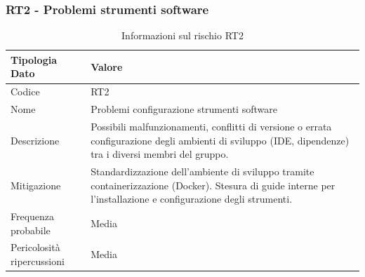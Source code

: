 \documentclass[a4paper,12pt]{article}
\begin{document}
\subsubsection{RT2 - Problemi strumenti software}
\begin{table}[H]
    \centering
    \renewcommand{\arraystretch}{1.4}
    \begin{tabularx}{\textwidth}{|L|Z|}
        \hline
        \textbf{Tipologia Dato} & \textbf{Valore} \\
        \hline
        Codice & RT2 \\
        \hline
        Nome & Problemi configurazione strumenti software \\
        \hline
        Descrizione & Possibili malfunzionamenti, conflitti di versione o errata configurazione degli ambienti di sviluppo (IDE, dipendenze) tra i diversi membri del gruppo. \\
        \hline
        Mitigazione & Standardizzazione dell'ambiente di sviluppo tramite containerizzazione (Docker). Stesura di guide interne per l'installazione e configurazione degli strumenti. \\
        \hline
        Frequenza probabile & Media \\
        \hline
        Pericolosità ripercussioni & Media \\
        \hline
    \end{tabularx}
    \caption{Informazioni sul rischio RT2}
    \label{tab:RT2}
\end{table}
\end{document}
